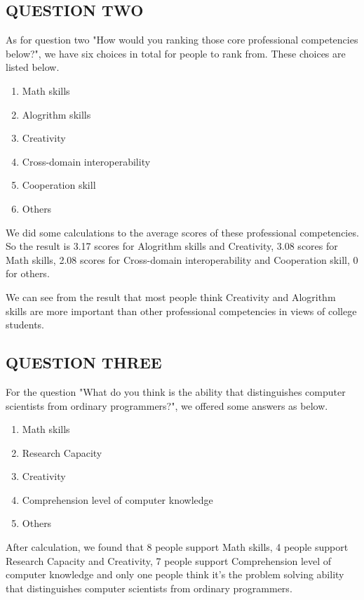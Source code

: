 \documentclass[conference]{IEEEtran}
\begin{document}
\subsection{QUESTION TWO}
\par As for question two "How would you ranking those core professional competencies below?", we have six choices in total for people to rank from. These choices are listed below.
\begin{enumerate}
    \item Math skills
    \item Alogrithm skills
    \item Creativity
    \item Cross-domain interoperability
    \item Cooperation skill
    \item Others
\end{enumerate}
\par We did some calculations to the average scores of these professional competencies. So the result is 3.17 scores for Alogrithm skills and Creativity, 3.08 scores for Math skills, 2.08 scores for Cross-domain interoperability and Cooperation skill, 0 for others.
\par We can see from the result that most people think Creativity and Alogrithm skills are more important than other professional competencies in views of college students.

\subsection{QUESTION THREE}
\par For the question "What do you think is the ability that distinguishes computer scientists from ordinary programmers?", we offered some answers as below.
\begin{enumerate}
    \item Math skills
    \item Research Capacity
    \item Creativity
    \item Comprehension level of computer knowledge
    \item Others
\end{enumerate}
\par After calculation, we found that 8 people support Math skills, 4 people support Research Capacity and Creativity, 7 people support Comprehension level of computer knowledge and only one people think it's the problem solving ability that distinguishes computer scientists from ordinary programmers.
\end{document}
